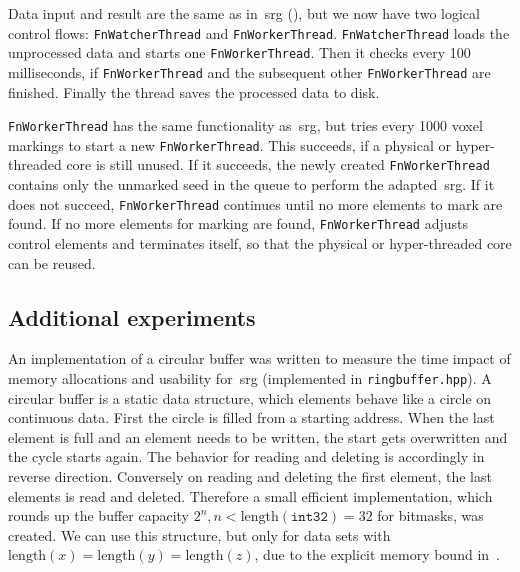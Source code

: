 \documentclass{article}
\begin{document}
Data input and result are the same as in~\ac{srg} (), but we now have two logical control flows: \texttt{FnWatcherThread} and \texttt{FnWorkerThread}.
\texttt{FnWatcherThread} loads the unprocessed data and starts one \texttt{FnWorkerThread}.
Then it checks every 100 milliseconds, if \texttt{FnWorkerThread} and the subsequent other \texttt{FnWorkerThread} are finished.
Finally the thread saves the processed data to disk.
\par
\texttt{FnWorkerThread} has the same functionality as~\ac{srg}, but tries every 1000 voxel markings to start a new \texttt{FnWorkerThread}.
This succeeds, if a physical or hyper-threaded core is still unused.
If it succeeds, the newly created \texttt{FnWorkerThread} contains only the unmarked seed in the queue to perform the adapted~\ac{srg}.
If it does not succeed, \texttt{FnWorkerThread} continues until no more elements to mark are found.
If no more elements for marking are found, \texttt{FnWorkerThread} adjusts control elements and terminates itself, so that the physical or hyper-threaded core can be reused.

\subsection{Additional experiments}\label{subsec:addexperiments}
An implementation of a circular buffer was written to measure the time impact of memory allocations and usability for~\ac{srg} (implemented in \texttt{ringbuffer.hpp}).
A circular buffer is a static data structure, which elements behave like a circle on continuous data.
First the circle is filled from a starting address.
When the last element is full and an element needs to be written, the start gets overwritten and the cycle starts again.
The behavior for reading and deleting is accordingly in reverse direction.
Conversely on reading and deleting the first element, the last elements is read and deleted.
Therefore a small efficient implementation, which rounds up the buffer capacity $2^n, n<\text{length}(\texttt{int32}) = 32$ for bitmasks, was created.
We can use this structure, but only for data sets with $\text{length}(x)=\text{length}(y)=\text{length}(z)$, due to the explicit memory bound in~.
\end{document}
